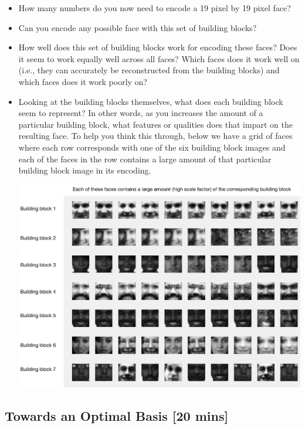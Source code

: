 \begin{itemize}
\normalsize
\item How many numbers do you now need to encode a 19 pixel by 19 pixel face?
\item Can you encode any possible face with this set of building blocks?
\item How well does this set of building blocks work for encoding these faces?  Does it seem to work equally well across all faces?  Which faces does it work well on (i.e., they can accurately be reconstructed from the building blocks) and which faces does it work poorly on?
\item Looking at the building blocks themselves, what does each building block seem to represent?  In other words, as you increases the amount of a particular building block, what features or qualities does that impart on the resulting face.  To help you think this through, below we have a grid of faces where each row corresponds with one of the six building block images and each of the faces in the row contains a large amount of that particular building block image in its encoding.

\begin{center}
\includegraphics[width=0.8\linewidth]{FacesDay1/figs/maximumfaces}
\end{center}

\end{itemize}

\subsection{Towards an Optimal Basis [20 mins]}

